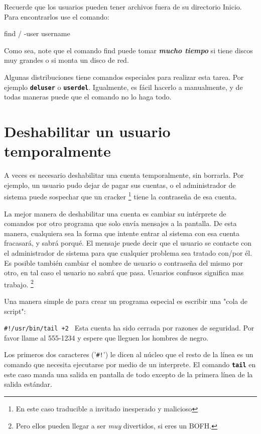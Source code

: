 \documentclass[12pt]{article}
\begin{document}
Recuerde que los usuarios pueden tener archivos fuera de su directorio
Inicio.  Para encontrarlos use el comando:

 find / -user username 

Como sea, note que el comando find puede tomar \textit{\bf mucho tiempo} si
tiene discos muy grandes o si monta un disco de red.


Algunas distribuciones tiene comandos especiales para realizar esta tarea. Por 
ejemplo
\texttt{\textbf{deluser}} o \texttt{\textbf{userdel}}. Igualmente, es fácil
hacerlo a manualmente, y de todas maneras puede que el comando no lo haga todo.






\section{ Deshabilitar un usuario temporalmente}

A veces es necesario deshabilitar una cuenta temporalmente, sin borrarla.
Por ejemplo, un usuario pudo dejar de pagar sus cuentas, o el administrador de
sistema puede sospechar que un cracker
	\footnote{En este caso traducible a invitado inesperado y
	malicioso} tiene la contraseña de esa
cuenta.

La mejor manera de deshabilitar una cuenta es cambiar su intérprete de
comandos por otro programa que solo envía mensajes a la pantalla. De esta manera,
cualquiera sea la forma que intente entrar al sistema con esa cuenta fracasará,
y sabrá porqué. El mensaje puede decir que el usuario se contacte con el
administrador de sistema para que cualquier problema sea tratado con/por
él. Es posible también cambiar el nombre de usuario o contraseña
del mismo por otro, en tal caso el usuario no sabrá que pasa. Usuarios confusos
significa mas trabajo.  \footnote{Pero ellos pueden llegar a ser
\textit{muy} divertidos, si eres un BOFH.}

	
	

 Una manera simple de para crear un programa especial es escribir una
"cola de script": 

 
\texttt{\#!/usr/bin/tail +2 }
Esta cuenta ha sido cerrada por razones de seguridad.
Por favor llame al 555-1234 y espere que lleguen los hombres de negro.



Los primeros dos caracteres ('\texttt{\#!}') le dicen al núcleo que el
resto de la línea es un comando que necesita ejecutarse por medio de un
interprete. El comando \texttt{\textbf{tail}} en este caso manda una salida en
pantalla de todo excepto de la primera línea de la salida estándar.
\end{document}
